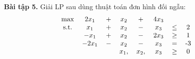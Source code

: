 \documentclass[12pt]{article}
\begin{document}
    \textbf{Bài tập 5.} Giải LP sau dùng thuật toán đơn hình đối ngẫu:
    \begin{align*}
        \begin{tabular}{cccccccc}
            \text{max} & $2x_1$ & $+$ & $x_2$ & $+$ & $4x_3$\\
            \text{s.t.} & $x_1$ & $+$ & $x_2$ & $-$ & $x_3$ & $\leq$ & 2 \\
            & $-x_1$ & $+$ & $x_2$ & $-$ & $2x_3$ & $\geq$ & 1 \\
            & $-2x_1$ & $-$ & $x_2$ & $-$ & $x_3$ & $=$ & -3 \\
            & & & $x_1,$ & $x_2,$ & $x_3$ & $\geq$ & 0
        \end{tabular}
    \end{align*}
\end{document}
